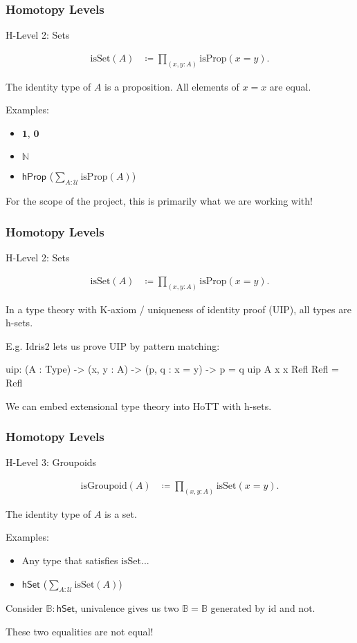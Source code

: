 \documentclass{beamer}
\begin{document}
\begin{frame}
\frametitle{Homotopy Levels}

H-Level 2: Sets

\begin{align*}
  \text{isSet}(A) & \coloneqq \prod_{(x,y:A)} \text{isProp}(x = y).
\end{align*}

The identity type of $A$ is a proposition.
All elements of $x = x$ are equal.

Examples:
\begin{itemize}
  \item $\mathbf{1}$, $\mathbf{0}$
  \item $\mathbb{N}$
  \item $\mathsf{hProp}$ ($\sum_{A : \mathcal{U}} \text{isProp}(A)$)
\end{itemize}

For the scope of the project, this is primarily what we are working with!

\end{frame}

\begin{frame}[fragile]
\frametitle{Homotopy Levels}

H-Level 2: Sets

\begin{align*}
  \text{isSet}(A) & \coloneqq \prod_{(x,y:A)} \text{isProp}(x = y).
\end{align*}

In a type theory with K-axiom / uniqueness of identity proof (UIP), all types
are h-sets.

E.g. Idris2 lets us prove UIP by pattern matching:

\begin{code}
uip: (A : Type) -> (x, y : A) -> (p, q : x = y) -> p = q
uip A x x Refl Refl = Refl
\end{code}

We can embed extensional type theory into HoTT with h-sets.

\end{frame}


\begin{frame}
\frametitle{Homotopy Levels}

H-Level 3: Groupoids

\begin{align*}
  \text{isGroupoid}(A) & \coloneqq \prod_{(x,y:A)} \text{isSet}(x = y).
\end{align*}

The identity type of $A$ is a set.

Examples:
\begin{itemize}
  \item Any type that satisfies $\text{isSet}$...
  \item $\mathsf{hSet}$ ($\sum_{A : \mathcal{U}} \text{isSet}(A)$)
\end{itemize}

Consider $\mathbb{B} : \mathsf{hSet}$, univalence gives us two $\mathbb{B} = \mathbb{B}$
generated by $\text{id}$ and $\text{not}$.

These two equalities are not equal!

\end{frame}
\end{document}
